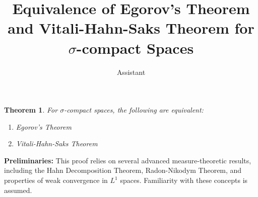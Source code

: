 \documentclass{article}
\newtheorem{theorem}{Theorem}
\begin{document}
\title{Equivalence of Egorov's Theorem and Vitali-Hahn-Saks Theorem for $\sigma$-compact Spaces}
\author{Assistant}
\date{}

\maketitle

\begin{theorem}
For $\sigma$-compact spaces, the following are equivalent:
\begin{enumerate}
    \item[(a)] Egorov's Theorem
    \item[(b)] Vitali-Hahn-Saks Theorem
\end{enumerate}
\end{theorem}

\noindent\textbf{Preliminaries:} This proof relies on several advanced measure-theoretic results, including the Hahn Decomposition Theorem, Radon-Nikodym Theorem, and properties of weak convergence in $L^1$ spaces. Familiarity with these concepts is assumed.
\end{document}
